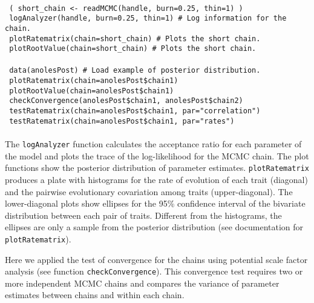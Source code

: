 \\
\hspace*{20pt} \texttt{ ( short\_chain <- readMCMC(handle, burn=0.25, thin=1) ) } \\
\hspace*{20pt} \texttt{ logAnalyzer(handle, burn=0.25, thin=1) \# Log information for the chain.}\\
\hspace*{20pt} \texttt{ plotRatematrix(chain=short\_chain) \# Plots the short chain. } \\
\hspace*{20pt} \texttt{ plotRootValue(chain=short\_chain) \# Plots the short chain. } \\
\\
\hspace*{20pt} \texttt{ data(anolesPost) \# Load example of posterior distribution.} \\
\hspace*{20pt} \texttt{ plotRatematrix(chain=anolesPost\$chain1) } \\
\hspace*{20pt} \texttt{ plotRootValue(chain=anolesPost\$chain1) } \\
\hspace*{20pt} \texttt{ checkConvergence(anolesPost\$chain1, anolesPost\$chain2) } \\
\hspace*{20pt} \texttt{ testRatematrix(chain=anolesPost\$chain1, par="correlation") } \\
\hspace*{20pt} \texttt{ testRatematrix(chain=anolesPost\$chain1, par="rates") }\\
\\
The \texttt{logAnalyzer} function calculates the acceptance ratio for each parameter of the model and plots the trace of the log-likelihood for the MCMC chain. The plot functions show the posterior distribution of parameter estimates. \texttt{plotRatematrix} produces a plate with histograms for the rate of evolution of each trait (diagonal) and the pairwise evolutionary covariation among traits (upper-diagonal). The lower-diagonal plots show ellipses for the 95\% confidence interval of the bivariate distribution between each pair of traits. Different from the histograms, the ellipses are only a sample from the posterior distribution (see documentation for \texttt{plotRatematrix}).

Here we applied the test of convergence for the chains using \citet{gelman_R_1992} potential scale factor analysis (see function \texttt{checkConvergence}). This convergence test requires two or more independent MCMC chains and compares the variance of parameter estimates between chains and within each chain.

